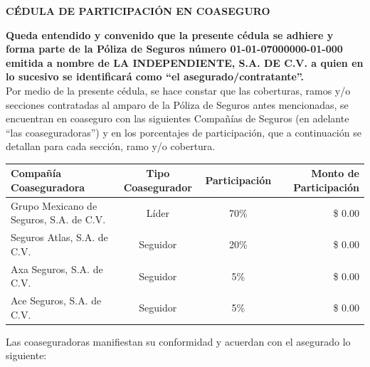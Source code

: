 \documentclass[letterpaper,10pt]{article}
\begin{document}
\begin{center}
    \textbf{CÉDULA DE PARTICIPACIÓN EN COASEGURO}
\end{center}

\textbf{Queda entendido y convenido que la presente cédula se adhiere y forma parte de la Póliza de Seguros número 01-01-07000000-01-000 emitida a nombre de LA INDEPENDIENTE, S.A. DE C.V. a quien en lo sucesivo se identificará como ``el asegurado/contratante''.}\\

Por medio de la presente cédula, se hace constar que las coberturas, ramos y/o secciones contratadas al amparo de la Póliza de Seguros antes mencionadas, se encuentran en coaseguro con las siguientes Compañías de Seguros (en adelante ``las coaseguradoras'') y en los porcentajes de participación, que a continuación se detallan para cada sección, ramo y/o cobertura.

\begin{center}
    \begin{tabularx}{\textwidth}{|X|c|c|r|}
        \hline
        \textbf{Compañía Coaseguradora} & \textbf{Tipo Coasegurador} & \textbf{Participación} & \textbf{Monto de Participación}\\\hline
        Grupo Mexicano de Seguros, S.A. de C.V. & Líder & 70\% & \$ 0.00\\\hline
        Seguros Atlas, S.A. de C.V. & Seguidor & 20\% & \$ 0.00\\\hline
        Axa Seguros, S.A. de C.V. & Seguidor & 5\% & \$ 0.00\\\hline
        Ace Seguros, S.A. de C.V. & Seguidor & 5\% & \$ 0.00\\
        \hline
    \end{tabularx}
\end{center}

Las coaseguradoras manifiestan su conformidad y acuerdan con el asegurado lo siguiente:
\end{document}
